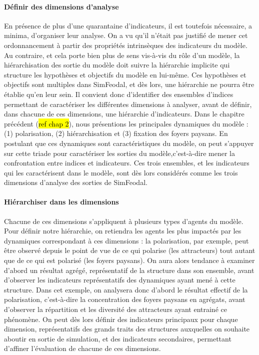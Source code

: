\paragraph{Définir des dimensions d'analyse}
En présence de plus d'une quarantaine d'indicateurs, il est toutefois nécessaire, a minima, d'organiser leur analyse. On a vu qu'il n'était pas justifié de mener cet ordonnancement à partir des propriétés intrinsèques des indicateurs du modèle.
Au contraire, et cela porte bien plus de sens vis-à-vis du rôle d'un modèle, la hiérarchisation des sortie du modèle doit suivre la hiérarchie implicite qui structure les hypothèses et objectifs du modèle en lui-même.
Ces hypothèses et objectifs sont multiples dans SimFeodal, et dès lors, une hiérarchie ne pourra être établie qu'en leur sein. Il convient donc d'identifier des ensembles d'indices permettant de caractériser les différentes dimensions à analyser, avant de définir, dans chacune de ces dimensions, une hiérarchie d'indicateurs.
Dans le chapitre précédent (\hl{ref chap 2}), nous présentions les principales dynamiques  du modèle : (1) polarisation, (2) hiérarchisation et (3) fixation des foyers paysans. En postulant que ces dynamiques sont caractéristiques du modèle, on peut s'appuyer sur cette triade pour caractériser les sorties du modèle,c'est-à-dire mener la confrontation entre indices et indicateurs. Ces trois ensembles, et les indicateurs qui les caractérisent dans le modèle, sont dès lors considérés comme les trois dimensions d'analyse des sorties de SimFeodal.

\paragraph{Hiérarchiser dans les dimensions}\label{par:hierarchie_interne}
Chacune de ces dimensions s'appliquent à plusieurs types d'agents du modèle. Pour définir notre hiérarchie, on retiendra les agents les plus impactés par les dynamiques correspondant à ces dimensions : la polarisation, par exemple, peut être observé depuis le point de vue de ce qui polarise (les attracteurs) tout autant que de ce qui est polarisé (les foyers paysans).
On aura alors tendance à examiner d'abord un résultat agrégé, représentatif de la structure dans son ensemble, avant d'observer les indicateurs représentatifs des dynamiques ayant mené à cette structure.
Dans cet exemple, on analysera donc d'abord le résultat effectif de la polarisation, c'est-à-dire la concentration des foyers paysans en agrégats, avant d'observer la répartition et les diversité des attracteurs ayant entrainé ce phénomène. On peut dès lors définir des \og indicateurs principaux\fg{} pour chaque dimension, représentatifs des grands traits des structures auxquelles on souhaite aboutir en sortie de simulation, et des \og indicateurs secondaires\fg{}, permettant d'affiner l'évaluation de chacune de ces dimensions.

